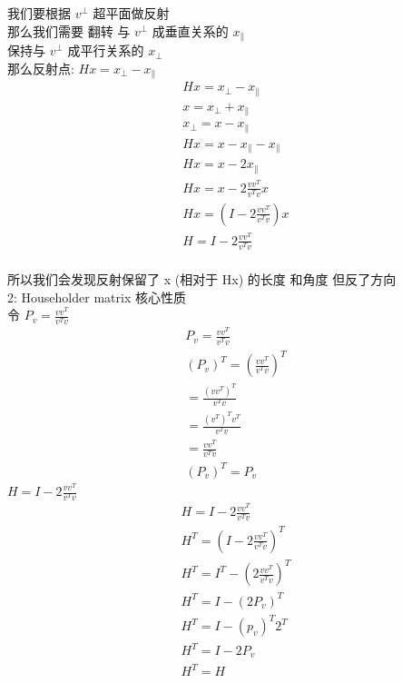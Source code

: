 \documentclass[12pt]{article}
\begin{document}
\begin{flushleft}
    我们要根据 $v^{\perp}$  超平面做反射 \\
    那么我们需要 翻转 与 $v^{\perp}$ 成垂直关系的 $x_{\parallel}$ \\
    保持与 $v^{\perp}$ 成平行关系的 $x_{\perp}$ \\

    那么反射点: $Hx = x_{\perp} - x_{\parallel}$ \\
    \begin{align}
        Hx = x_{\perp} - x_{\parallel}         \\
        x =  x_{\perp} + x_{\parallel}         \\
        x_{\perp} = x - x_{\parallel}          \\
        Hx = x - x_{\parallel} - x_{\parallel} \\
        Hx = x - 2x_{\parallel}                \\
        Hx = x - 2\frac{vv^{T}}{v^{T}v}x       \\
        Hx = (I  - 2\frac{vv^{T}}{v^{T}v})x    \\
        H  = I  - 2\frac{vv^{T}}{v^{T}v}       \\
    \end{align}

    所以我们会发现反射保留了 x (相对于 Hx) 的长度 和角度 但反了方向 \\


    2: Householder matrix 核心性质 \\
    令 $P_{v} = \frac{vv^{T}}{v^{T}v}$ \\
    \begin{align}
        P_{v} = \frac{vv^{T}}{v^{T}v}             \\
        (P_{v})^{T} = (\frac{vv^{T}}{v^{T}v})^{T} \\
        =  \frac{(vv^{T})^{T}}{v^{T}v}            \\
        = \frac{(v^{T})^{T}v^{T}}{v^{T}v}         \\
        = \frac{vv^{T}}{v^{T}v}                   \\
        (P_{v})^{T} = P_{v}
    \end{align}
    $H = I  - 2\frac{vv^{T}}{v^{T}v}$ \\
    \begin{align}
        H  = I  - 2\frac{vv^{T}}{v^{T}v}             \\
        H^{T} = (I  - 2\frac{vv^{T}}{v^{T}v})^{T}    \\
        H^{T} = I^{T} - (2\frac{vv^{T}}{v^{T}v})^{T} \\
        H^{T} = I - (2P_{v})^{T}                     \\
        H^{T} = I - (p_{v})^{T}2^{T}                 \\
        H^{T} = I - 2P_{v}                           \\
        H^{T} = H                                    \\
    \end{align}


\end{flushleft}
\end{document}
